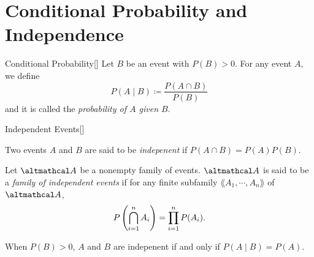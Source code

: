 \documentclass[../complex_variables_1.tex]{subfiles}
\begin{document}
\section{Conditional Probability and Independence}

\begin{Definition}{Conditional Probability}[]
    Let \(B\) be an event with \(P(B) > 0\).
    For any event \(A\), we define
    \[
        P(A \mid B) \coloneqq \frac{P(A \cap B)}{P(B)}
    \]
    and it is called the \emph{probability of \(A\) given \(B\)}.
\end{Definition}

\begin{Definition}{Independent Events}[]
\begin{enumerate}[label=(\arabic*)]
    \ii
    Two events \(A\) and \(B\) are said to be \emph{indepenent} if
    \(P(A \cap B) = P(A)P(B)\).

    \ii
    Let \(\mcal{A}\) be a nonempty family of events.
    \(\mcal{A}\) is said to be a \emph{family of independent events} if
    for any finite subfamily \(\lang A_1, \cdots, A_n \rang\) of \(\mcal{A}\),
    \[
        P\left( \bigcap_{i=1}^n A_i \right) = \prod_{i=1}^n P(A_i)\text.
    \]
\end{enumerate}
\end{Definition}

\begin{note}
    When \(P(B) > 0\), \(A\) and \(B\) are indepenent
    if and only if \(P(A \mid B) = P(A)\).
\end{note}
\end{document}
